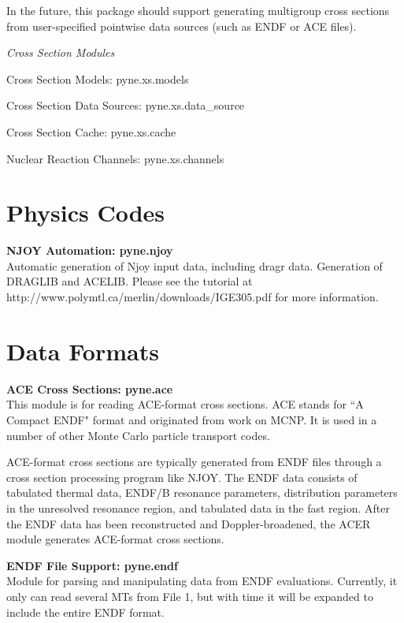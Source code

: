 \documentclass{proposalnsf}
\begin{document}
In the future, this package should support generating multigroup cross sections from user-specified pointwise data sources (such as ENDF or ACE files).

\textit{Cross Section Modules}
\begin{compactitem}
\item Cross Section Models: pyne.xs.models
\item Cross Section Data Sources: pyne.xs.data\_source
\item Cross Section Cache: pyne.xs.cache
\item Nuclear Reaction Channels: pyne.xs.channels
\end{compactitem}

\section{Physics Codes}
\textbf{NJOY Automation: pyne.njoy}\\
Automatic generation of Njoy input data, including dragr data. Generation of DRAGLIB and ACELIB. Please see the tutorial at http://www.polymtl.ca/merlin/downloads/IGE305.pdf for more information.

\section{Data Formats}

\textbf{ACE Cross Sections: pyne.ace}\\
This module is for reading ACE-format cross sections. ACE stands for ``A Compact ENDF" format and originated from work on MCNP. It is used in a number of other Monte Carlo particle transport codes.

ACE-format cross sections are typically generated from ENDF files through a cross section processing program like NJOY. The ENDF data consists of tabulated thermal data, ENDF/B resonance parameters, distribution parameters in the unresolved resonance region, and tabulated data in the fast region. After the ENDF data has been reconstructed and Doppler-broadened, the ACER module generates ACE-format cross sections.

\textbf{ENDF File Support: pyne.endf}\\
Module for parsing and manipulating data from ENDF evaluations. Currently, it only can read several MTs from File 1, but with time it will be expanded to include the entire ENDF format.
\end{document}

